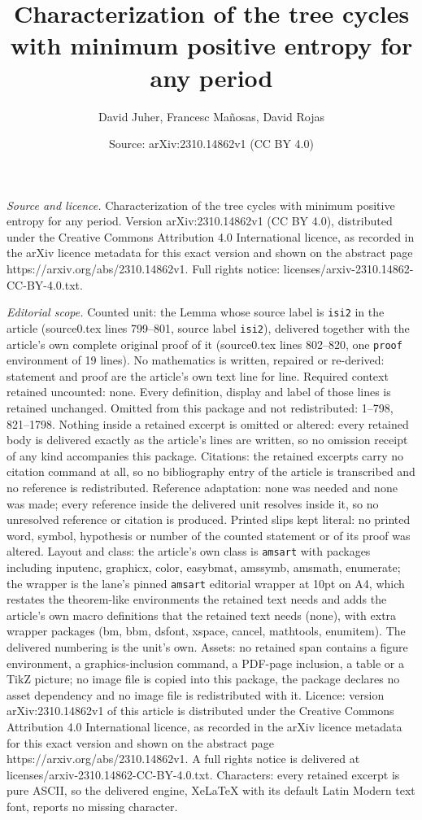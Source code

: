 \documentclass[10pt,a4paper]{amsart}
\title[Characterization of the tree cycles with minimum positive en]{Characterization of the tree cycles with minimum positive entropy for any period}
\author{David Juher, Francesc Ma\~nosas, David Rojas}
\date{Source: arXiv:2310.14862v1 (CC BY 4.0)}
\begin{document}
\maketitle

\noindent\emph{Source and licence.} Characterization of the tree cycles with minimum positive entropy for any period. Version arXiv:2310.14862v1 (CC BY 4.0), distributed under the Creative Commons Attribution 4.0 International licence, as recorded in the arXiv licence metadata for this exact version and shown on the abstract page https://arxiv.org/abs/2310.14862v1. Full rights notice: licenses/arxiv-2310.14862-CC-BY-4.0.txt.\par\smallskip

\noindent\textit{Editorial scope.} Counted unit: the Lemma whose source label is \texttt{isi2} in the article (source0.tex lines 799--801, source label \texttt{isi2}), delivered together with the article's own complete original proof of it (source0.tex lines 802--820, one \texttt{proof} environment of 19 lines). No mathematics is written, repaired or re-derived: statement and proof are the article's own text line for line. Required context retained uncounted: none. Every definition, display and label of those lines is retained unchanged. Omitted from this package and not redistributed: 1--798, 821--1798. Nothing inside a retained excerpt is omitted or altered: every retained body is delivered exactly as the article's lines are written, so no omission receipt of any kind accompanies this package. Citations: the retained excerpts carry no citation command at all, so no bibliography entry of the article is transcribed and no reference is redistributed. Reference adaptation: none was needed and none was made; every reference inside the delivered unit resolves inside it, so no unresolved reference or citation is produced. Printed slips kept literal: no printed word, symbol, hypothesis or number of the counted statement or of its proof was altered. Layout and class: the article's own class is \texttt{amsart} with packages including inputenc, graphicx, color, easybmat, amssymb, amsmath, enumerate; the wrapper is the lane's pinned \texttt{amsart} editorial wrapper at 10pt on A4, which restates the theorem-like environments the retained text needs and adds the article's own macro definitions that the retained text needs (none), with extra wrapper packages (bm, bbm, dsfont, xspace, cancel, mathtools, enumitem). The delivered numbering is the unit's own. Assets: no retained span contains a figure environment, a graphics-inclusion command, a PDF-page inclusion, a table or a TikZ picture; no image file is copied into this package, the package declares no asset dependency and no image file is redistributed with it. Licence: version arXiv:2310.14862v1 of this article is distributed under the Creative Commons Attribution 4.0 International licence, as recorded in the arXiv licence metadata for this exact version and shown on the abstract page https://arxiv.org/abs/2310.14862v1. A full rights notice is delivered at licenses/arxiv-2310.14862-CC-BY-4.0.txt. Characters: every retained excerpt is pure ASCII, so the delivered engine, XeLaTeX with its default Latin Modern text font, reports no missing character.
\end{document}

